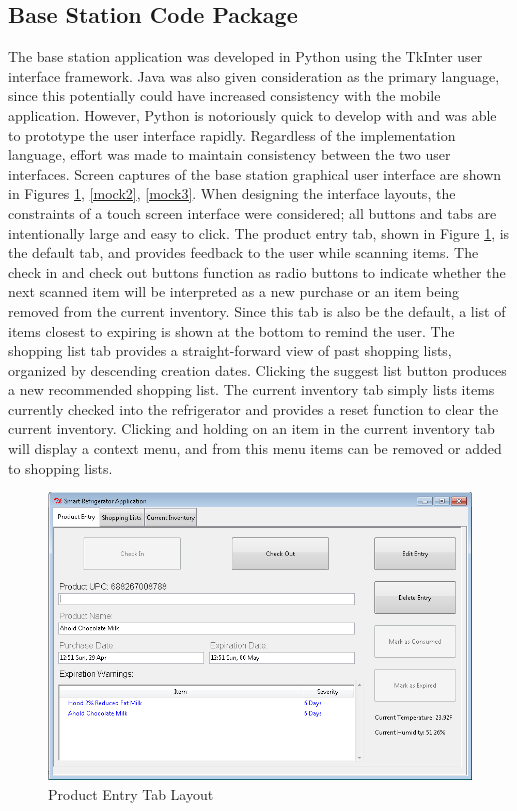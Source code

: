 \documentclass[11pt]{article} %
\begin{document}
\subsection{Base Station Code Package}
The base station application was developed in Python using the TkInter user interface framework. Java was also given consideration as the primary language, since this potentially could have increased consistency with the mobile application. However, Python is notoriously quick to develop with and was able to prototype the user interface rapidly. Regardless of the implementation language, effort was made to maintain consistency between the two user interfaces. Screen captures of the base station graphical user interface are shown in Figures \ref{mock1}, \ref{mock2}, \ref{mock3}. When designing the interface layouts, the constraints of a touch screen interface were considered; all buttons and tabs are intentionally large and easy to click. The product entry tab, shown in Figure \ref{mock1}, is the default tab, and provides feedback to the user while scanning items. The check in and check out buttons function as radio buttons to indicate whether the next scanned item will be interpreted as a new purchase or an item being removed from the current inventory. Since this tab is also be the default, a list of items closest to expiring is shown at the bottom to remind the user. The shopping list tab provides a straight-forward view of past shopping lists, organized by descending creation dates. Clicking the suggest list button produces a new recommended shopping list. The current inventory tab simply lists items currently checked into the refrigerator and provides a reset function to clear the current inventory. Clicking and holding on an item in the current inventory tab will display a context menu, and from this menu items can be removed or added to shopping lists.
\pagebreak
\begin{figure}[h!]
\vspace{0.5cm}
\begin{center}
\includegraphics[scale=0.45]{../graphics/ProductEntry}
\caption{Product Entry Tab Layout}
\label{mock1}
\end{center}
\end{figure}
\end{document}
